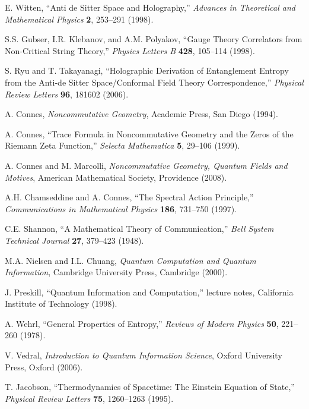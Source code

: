 \documentclass[12pt,a4paper]{article}
\begin{document}
\begin{thebibliography}{99}
 E. Witten, ``Anti de Sitter Space and Holography,'' \emph{Advances in Theoretical and Mathematical Physics} \textbf{2}, 253--291 (1998).

 S.S. Gubser, I.R. Klebanov, and A.M. Polyakov, ``Gauge Theory Correlators from Non-Critical String Theory,'' \emph{Physics Letters B} \textbf{428}, 105--114 (1998).

 S. Ryu and T. Takayanagi, ``Holographic Derivation of Entanglement Entropy from the Anti-de Sitter Space/Conformal Field Theory Correspondence,'' \emph{Physical Review Letters} \textbf{96}, 181602 (2006).

 A. Connes, \emph{Noncommutative Geometry}, Academic Press, San Diego (1994).

 A. Connes, ``Trace Formula in Noncommutative Geometry and the Zeros of the Riemann Zeta Function,'' \emph{Selecta Mathematica} \textbf{5}, 29--106 (1999).

 A. Connes and M. Marcolli, \emph{Noncommutative Geometry, Quantum Fields and Motives}, American Mathematical Society, Providence (2008).

 A.H. Chamseddine and A. Connes, ``The Spectral Action Principle,'' \emph{Communications in Mathematical Physics} \textbf{186}, 731--750 (1997).

 C.E. Shannon, ``A Mathematical Theory of Communication,'' \emph{Bell System Technical Journal} \textbf{27}, 379--423 (1948).

 M.A. Nielsen and I.L. Chuang, \emph{Quantum Computation and Quantum Information}, Cambridge University Press, Cambridge (2000).

 J. Preskill, ``Quantum Information and Computation,'' lecture notes, California Institute of Technology (1998).

 A. Wehrl, ``General Properties of Entropy,'' \emph{Reviews of Modern Physics} \textbf{50}, 221--260 (1978).

 V. Vedral, \emph{Introduction to Quantum Information Science}, Oxford University Press, Oxford (2006).

 T. Jacobson, ``Thermodynamics of Spacetime: The Einstein Equation of State,'' \emph{Physical Review Letters} \textbf{75}, 1260--1263 (1995).


\end{thebibliography}
\end{document}
